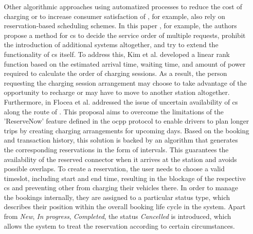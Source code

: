 \noindent Other algorithmic approaches using automatized processes to reduce the cost of charging or to increase consumer satisfaction of , for example, also rely on reservation-based scheduling schemes.
In this paper \cite{kim_efficient_2010}, for example, the authors propose a method for \acrshort{cs} to decide the service order of multiple requests, prohibit the introduction of additional systems altogether, and try to extend the functionality of \acrshort{cs} itself. 
To address this, Kim et al. developed a linear rank function based on the estimated arrival time, waiting time, and amount of power required to calculate the order of charging sessions.
As a result, the person requesting the charging session arrangement may choose to take advantage of the opportunity to recharge or may have to move to another station altogether. \\
\noindent Furthermore, in \cite{flocea_electric_2022} Flocea et al. addressed the issue of uncertain availability of \acrshort{cs} along the route of . 
This proposal aims to overcome the limitations of the 'ReserveNow' feature defined in the \acrshort{ocpp} protocol to enable drivers to plan longer trips by creating charging arrangements for upcoming days.
Based on the  booking and transaction history, this solution is backed by an algorithm that generates the corresponding reservations in the form of intervals.
This guarantees the availability of the reserved connector when it arrives at the station and avoids possible overlaps.
To create a reservation, the user needs to choose a valid timeslot, including start and end time, resulting in the blockage of the respective \acrshort{cs} and preventing other  from charging their vehicles there.
In order to manage the bookings internally, they are assigned to a particular status type, which describes their position within the overall booking life cycle in the system. 
Apart from \textit{New}, \textit{In progress}, \textit{Completed}, the status \textit{Cancelled} is introduced, which allows the system to treat the reservation according to certain circumstances.
